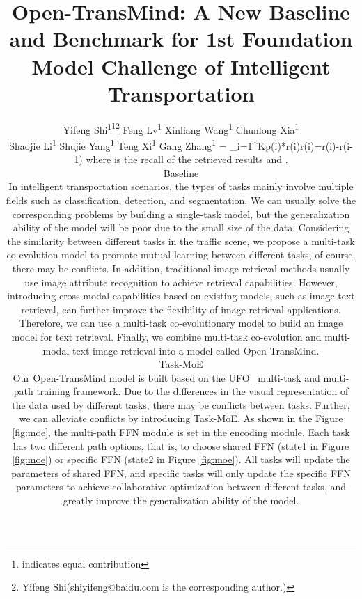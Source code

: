 \documentclass[10pt,twocolumn,letterpaper]{article}
\begin{document}
\title{Open-TransMind: A New Baseline and Benchmark for 1st Foundation Model Challenge of Intelligent Transportation}

\author
{ 
Yifeng Shi\textsuperscript{1}\thanks{indicates equal contribution}\thanks{Yifeng Shi(shiyifeng@baidu.com is the corresponding author.)}
\quad
Feng Lv\textsuperscript{1}
\quad
Xinliang Wang\textsuperscript{1}
\quad
Chunlong Xia\textsuperscript{1}\\
\quad
Shaojie Li\textsuperscript{1}
\quad
Shujie Yang\textsuperscript{1}
\quad
Teng Xi\textsuperscript{1}
\quad
Gang Zhang\textsuperscript{1}
\mAP@K= \times \sum_{i=1}^{K}{p(i)*\Delta r(i)}\Delta r(i)=r(i)-r(i-1)
where  is the recall of the  retrieved results and .



\section{Baseline}
In intelligent transportation scenarios, the types of tasks mainly involve multiple fields such as classification, detection, and segmentation. We can usually solve the corresponding problems by building a single-task model, but the generalization ability of the model will be poor due to the small size of the data. Considering the similarity between different tasks in the traffic scene, we propose a multi-task co-evolution model to promote mutual learning between different tasks, of course, there may be conflicts. In addition, traditional image retrieval methods usually use image attribute recognition to achieve retrieval capabilities. However, introducing cross-modal capabilities based on existing models, such as image-text retrieval, can further improve the flexibility of image retrieval applications. Therefore, we can use a multi-task co-evolutionary model to build an image model for text retrieval. Finally, we combine multi-task co-evolution and multi-modal text-image retrieval into a model called Open-TransMind.

\subsection{Task-MoE}
Our Open-TransMind model is built based on the UFO~\cite{xi2022ufo} multi-task and multi-path training framework. Due to the differences in the visual representation of the data used by different tasks, there may be conflicts between tasks. Further, we can alleviate conflicts by introducing Task-MoE. As shown in the Figure \ref{fig:moe}, the multi-path FFN module is set in the encoding module. Each task has two different path options, that is, to choose shared FFN (state1 in Figure \ref{fig:moe}) or specific FFN (state2 in Figure \ref{fig:moe}). All tasks will update the parameters of shared FFN, and specific tasks will only update the specific FFN parameters to achieve collaborative optimization between different tasks, and greatly improve the generalization ability of the model.


}
\end{document}
